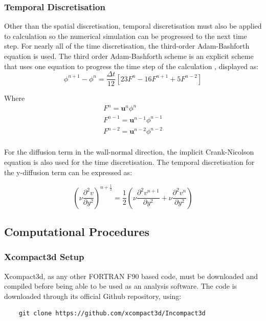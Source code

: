 \subsubsection{Temporal Discretisation}
\label{sec:temp_disc}
Other than the spatial discretisation, temporal discretisation must also be applied to calculation so the numerical simulation can be progressed to the next time step. For nearly all of the time discretisation, the third-order Adam-Bashforth equation is used. The third order Adam-Bashforth scheme is an explicit scheme that uses one equation to progress the time step of the calculation \cite{Durran1991}, displayed as:
\begin{equation}
	\phi^{n+1} - \phi^{n} = \frac{\Delta t}{12} [23F^{n} - 16F^{n+1}+5F^{n-2}]
\end{equation}

Where
\begin{equation*}
	\begin{gathered}
		F^n = \mathbf{u}^n \phi^n\\
		F^{n-1} = \mathbf{u}^{n-1} \phi^{n-1}\\
		F^{n-2} = \mathbf{u}^{n-2} \phi^{n-2}\\
		\label{eq:Fhalf}
	\end{gathered}
\end{equation*}

For the diffusion term in the wall-normal direction, the implicit Crank-Nicolson equation is also used for the time discretisation. The temporal discretisation for the y-diffusion term can be expressed as:

\begin{equation}
	\left( \nu \frac{\partial^2 v}{\partial y^2} \right)^{n+\frac{1}{2}} = \frac{1}{2} \left( \nu \frac{\partial^2 v^{n+1}}{\partial y^2} + \nu \frac{\partial^2 v^n}{\partial y^2} \right)
\end{equation}




\subsection{Computational Procedures}
\label{sec:Computational procedures}

\subsubsection{Xcompact3d Setup}
\label{sec:Xcompact3d Setup}
Xcompact3d, as any other FORTRAN F90 based code, must be downloaded and compiled before being able to be used as an analysis software. The code is downloaded through its official Github repository, using:
\begin{verbatim}
	git clone https://github.com/xcompact3d/Incompact3d
\end{verbatim}

